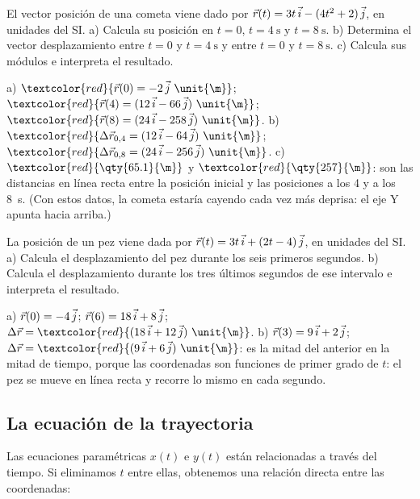 \begin{exercise}
    El vector posición de una cometa viene dado por \(\vec r(t) = 3t\,\vec{i} - (4t^2 + 2)\,\vec{j}\), en unidades del SI.
    a) Calcula su posición en \(t = 0\), \(t = \qty{4}{\s}\) y \(t = \qty{8}{\s}\). b) Determina el vector desplazamiento entre
    \(t = 0\) y \(t = \qty{4}{\s}\) y entre \(t = 0\) y \(t = \qty{8}{\s}\). c) Calcula sus módulos e interpreta el resultado.
    \begin{solu}
        a) \(\textcolor{red}{\vec r(0) = -2\,\jvec~\unit{\m}}\); \(\textcolor{red}{\vec r(4) = (12\,\ivec - 66\,\jvec)~\unit{\m}}\);
        \(\textcolor{red}{\vec r(8) = (24\,\ivec - 258\,\jvec)~\unit{\m}}\). b) \(\textcolor{red}{\Delta\vec r_{0,4} = (12\,\ivec - 64\,\jvec)~\unit{\m}}\);
        \(\textcolor{red}{\Delta\vec r_{0,8} = (24\,\ivec - 256\,\jvec)~\unit{\m}}\). c) \(\textcolor{red}{\qty{65.1}{\m}}\) y
        \(\textcolor{red}{\qty{257}{\m}}\): son las distancias en línea recta entre la posición inicial y las posiciones a los 4 y
        a los \qty{8}{\s}. (Con estos datos, la cometa estaría cayendo cada vez más deprisa: el eje Y apunta hacia arriba.)
    \end{solu}
\end{exercise}

\begin{exercise}
    La posición de un pez viene dada por \(\vec r(t) = 3t\,\vec{i} + (2t - 4)\,\vec{j}\), en unidades del SI. a) Calcula el
    desplazamiento del pez durante los seis primeros segundos. b) Calcula el desplazamiento durante los tres últimos segundos de
    ese intervalo e interpreta el resultado.
    \begin{solu}
        a) \(\vec r(0) = -4\,\vec{j}\); \(\vec r(6) = 18\,\vec{i} + 8\,\vec{j}\); \(\Delta\vec r = \textcolor{red}{(18\,\ivec + 12\,\jvec)~\unit{\m}}\).
        b) \(\vec r(3) = 9\,\vec{i} + 2\,\vec{j}\); \(\Delta\vec r = \textcolor{red}{(9\,\ivec + 6\,\jvec)~\unit{\m}}\): es la mitad
        del anterior en la mitad de tiempo, porque las coordenadas son funciones de primer grado de \(t\): el pez se mueve en
        línea recta y recorre lo mismo en cada segundo.
    \end{solu}
\end{exercise}

\subsection{La ecuación de la trayectoria}

Las ecuaciones paramétricas \(x(t)\) e \(y(t)\) están relacionadas a través del tiempo. Si eliminamos \(t\) entre ellas, obtenemos
una relación directa entre las coordenadas:

